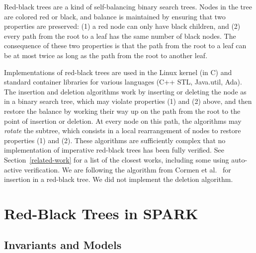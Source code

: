 \documentclass[11pt,a4paper]{article}
\newcommand{\spark}{SPARK\xspace}
\begin{document}
Red-black trees are a kind of self-balancing binary search trees. Nodes in the
tree are colored red or black, and balance is maintained by ensuring that two
properties are preserved: (1) a red node can only have black children, and (2)
every path from the root to a leaf has the same number of black nodes. The
consequence of these two properties is that the path from the root to a leaf
can be at most twice as long as the path from the root to another leaf.

Implementations of red-black trees are used in the Linux kernel (in C) and
standard container libraries for various languages (C++ STL, Java.util,
Ada). The insertion and deletion algorithms work by inserting or deleting the
node as in a binary search tree, which may violate properties (1) and (2)
above, and then restore the balance by working their way up on the path from
the root to the point of insertion or deletion. At every node on this path, the
algorithms may \emph{rotate} the subtree, which consists in a local
rearrangement of nodes to restore properties (1) and (2). These algorithms are
sufficiently complex that no implementation of imperative red-black trees has
been fully verified. See Section~\ref{related-work} for a list of the closest
works, including some using auto-active verification. We are following the
algorithm from Cormen et al.~\cite{Cormen2009} for insertion in a red-black
tree. We did not implement the deletion algorithm.

\section{Red-Black Trees in \spark}
\subsection{Invariants and Models}
\label{sec-rbt-inv}

\end{document}
